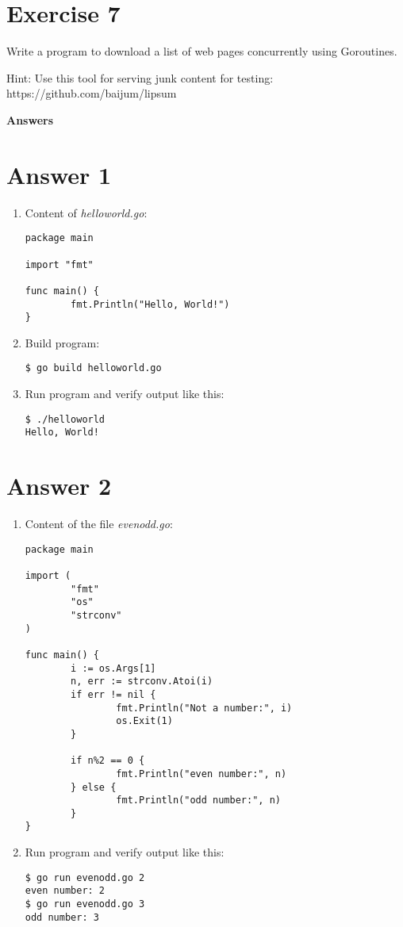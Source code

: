 \documentclass[11pt,a4paper]{article}
\begin{document}
\section*{Exercise 7}

Write a program to download a list of web pages concurrently using
Goroutines.

\noindent
Hint: Use this tool for serving junk content for testing:
https://github.com/baijum/lipsum

\newpage

\centerline{\LARGE\bf Answers}
\section*{Answer 1}

\begin{enumerate}
\item Content of {\it helloworld.go}:
\begin{verbatim}
package main

import "fmt"

func main() {
        fmt.Println("Hello, World!")
}
\end{verbatim}

\item Build program:
\begin{verbatim}
$ go build helloworld.go
\end{verbatim}

\item Run program and verify output like this:
\begin{verbatim}
$ ./helloworld
Hello, World!
\end{verbatim}
\end{enumerate}

\section*{Answer 2}
\begin{enumerate}
\item Content of the file {\it evenodd.go}:
\begin{verbatim}
package main

import (
        "fmt"
        "os"
        "strconv"
)

func main() {
        i := os.Args[1]
        n, err := strconv.Atoi(i)
        if err != nil {
                fmt.Println("Not a number:", i)
                os.Exit(1)
        }

        if n%2 == 0 {
                fmt.Println("even number:", n)
        } else {
                fmt.Println("odd number:", n)
        }
}
\end{verbatim}

\item Run program and verify output like this:
\begin{verbatim}
$ go run evenodd.go 2
even number: 2
$ go run evenodd.go 3
odd number: 3
\end{verbatim}

\end{enumerate}
\end{document}
